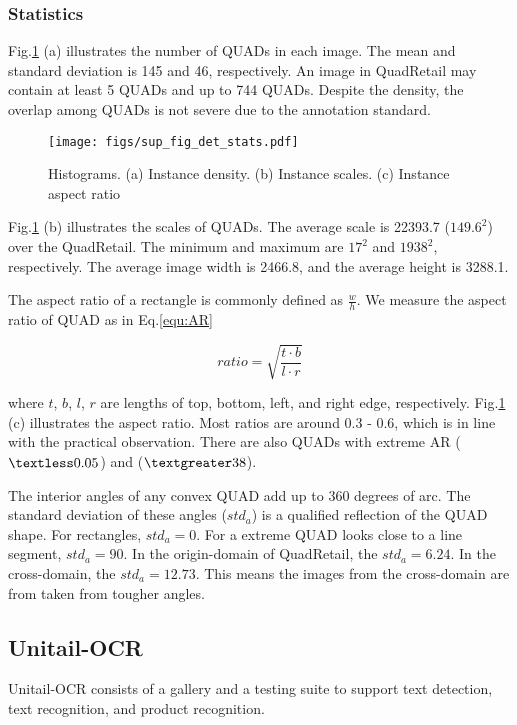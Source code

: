 \documentclass[runningheads]{llncs}
\begin{document}
\subsubsection{Statistics}
Fig.\ref{fig:sup_fig_det_stats} (a) illustrates the number of QUADs in each image. The mean and standard deviation is 145 and 46, respectively. An image in QuadRetail may contain at least 5 QUADs and up to 744 QUADs. Despite the density, the overlap among QUADs is not severe due to the annotation standard. 

\begin{figure}[t]
    \centering
    \texttt{[image: figs/sup\_fig\_det\_stats.pdf]}
    \caption{Histograms. (a) Instance density. (b) Instance scales. (c) Instance aspect ratio}
    \label{fig:sup_fig_det_stats}
\end{figure}

Fig.\ref{fig:sup_fig_det_stats} (b) illustrates the scales of QUADs. The average scale is 22393.7 ($149.6^2$) over the QuadRetail. The minimum and maximum are $17^2$ and $1938^2$, respectively. The average image width is 2466.8, and the average height is 3288.1. 

The aspect ratio of a rectangle is commonly defined as $\frac{w}{h}$. We measure the aspect ratio of QUAD as in Eq.\ref{equ:AR}

\begin{equation}
ratio = \sqrt{\frac{t \cdot b}{l \cdot r}}   
\label{equ:AR}
\end{equation}

\noindent where $t$, $b$, $l$, $r$ are lengths of top, bottom, left, and right edge, respectively. Fig.\ref{fig:sup_fig_det_stats} (c) illustrates the aspect ratio. Most ratios are around 0.3 - 0.6, which is in line with the practical observation. There are also QUADs with extreme AR ($\textless 0.05$) and ($\textgreater 38$).

The interior angles of any convex QUAD add up to 360 degrees of arc. The standard deviation of these angles ($std_a$) is a qualified reflection of the QUAD shape. For rectangles, $std_a = 0$. For a extreme QUAD looks close to a line segment, $std_a=90$. In the origin-domain of QuadRetail, the $std_a=6.24$. In the cross-domain, the $std_a=12.73$. This means the images from the cross-domain are from taken from tougher angles.

\subsection{Unitail-OCR}
Unitail-OCR consists of a gallery and a testing suite to support text detection, text recognition, and product recognition.
\end{document}
